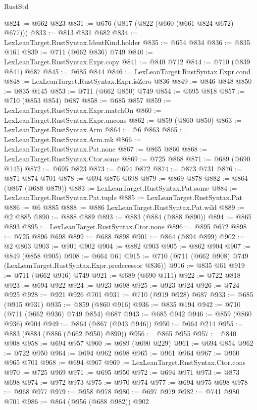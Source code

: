 \begin{lexlean}{RustStd}
\begin{coremodule}
@824 := @662 @823
@831 := @676 (@817 (@822 (@660 (@661 @824 @672) @677)))
@833 := @813 @831 @682
@834 := LexLeanTarget.RustSyntax.IdentKind.holder
@835 := @654 @834
@836 := @835 @161
@839 := @711 (@662 @836) @749
@840 := LexLeanTarget.RustSyntax.Expr.copy
@841 := @840 @712
@844 := @710 (@839 @841) @687
@845 := @685 @844
@846 := LexLeanTarget.RustSyntax.Expr.cond
@848 := LexLeanTarget.RustSyntax.Expr.isZero @836
@849 := @846 @848
@850 := @835 @145
@853 := @711 (@662 @850) @749
@854 := @695 @818
@857 := @710 (@853 @854) @687
@858 := @685 @857
@859 := LexLeanTarget.RustSyntax.Expr.matchOn
@860 := LexLeanTarget.RustSyntax.Expr.uncons
@862 := @859 (@860 @850)
@863 := LexLeanTarget.RustSyntax.Arm
@864 := @6 @863
@865 := LexLeanTarget.RustSyntax.Arm.mk
@866 := LexLeanTarget.RustSyntax.Pat.none
@867 := @865 @866
@868 := LexLeanTarget.RustSyntax.Ctor.some
@869 := @725 @868
@871 := @689 (@690 @145)
@872 := @695 @823
@873 := @694 @872
@874 := @873 @731
@876 := @871 @874 @701
@878 := @694 @876 @698
@879 := @869 @878
@882 := @864 (@867 (@688 @879))
@883 := LexLeanTarget.RustSyntax.Pat.some
@884 := LexLeanTarget.RustSyntax.Pat.tuple
@885 := LexLeanTarget.RustSyntax.Pat
@886 := @6 @885
@888 := @886 LexLeanTarget.RustSyntax.Pat.wild
@889 := @2 @885
@890 := @888 @889
@893 := @883 (@884 (@888 @890))
@894 := @865 @893
@895 := LexLeanTarget.RustSyntax.Ctor.none
@896 := @895 @672
@898 := @725 @896 @698
@899 := @688 @898
@901 := @864 (@894 @899)
@902 := @2 @863
@903 := @901 @902
@904 := @882 @903
@905 := @862 @904
@907 := @849 (@858 @905)
@908 := @664 @61
@915 := @710 (@711 (@662 @908) @749 (LexLeanTarget.RustSyntax.Expr.predecessor @836))
@916 := @835 @61
@919 := @711 (@662 @916) @749
@921 := @689 (@690 @111)
@922 := @722 @818
@923 := @694 @922
@924 := @923 @698
@925 := @923 @924
@926 := @724 @925
@928 := @921 @926 @701
@931 := @710 (@919 @928) @687
@933 := @685 (@915 @931)
@935 := @859 (@860 @916)
@936 := @835 @194
@942 := @710 (@711 (@662 @936) @749 @854) @687
@943 := @685 @942
@946 := @859 (@860 @936) @904
@949 := @864 (@867 (@943 @946))
@950 := @664 @214
@955 := @883 (@884 (@886 (@662 @950) @890))
@956 := @865 @955
@957 := @840 @908
@958 := @694 @957
@960 := @689 (@690 @229)
@961 := @694 @854
@962 := @722 @950
@964 := @694 @962 @698
@965 := @961 @964
@967 := @960 @965 @701
@968 := @694 @967
@969 := LexLeanTarget.RustSyntax.Ctor.cons
@970 := @725 @969
@971 := @695 @950
@972 := @694 @971
@973 := @873 @698
@974 := @972 @973
@975 := @970 @974
@977 := @694 @975 @698
@978 := @968 @977
@979 := @958 @978
@980 := @697 @979
@982 := @741 @980 @701
@986 := @864 (@956 (@688 @982)) @902

\end{coremodule}
\end{lexlean}
